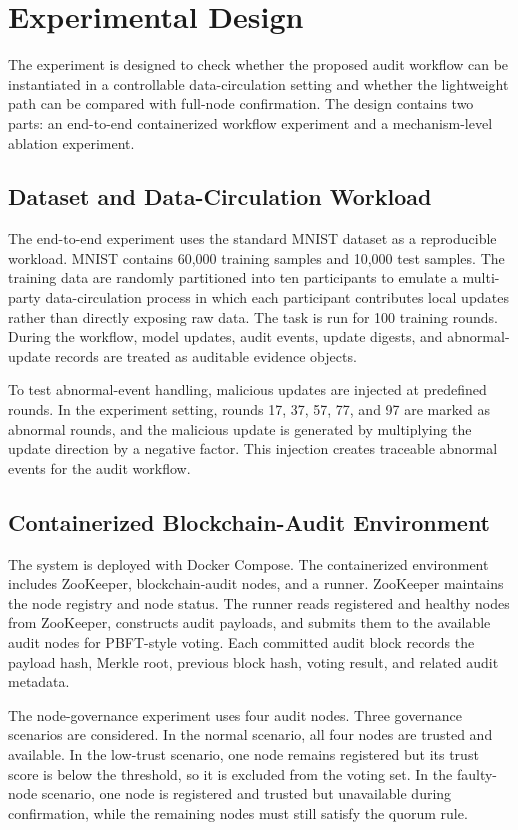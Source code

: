 \section{Experimental Design}

The experiment is designed to check whether the proposed audit workflow can be instantiated in a controllable data-circulation setting and whether the lightweight path can be compared with full-node confirmation. The design contains two parts: an end-to-end containerized workflow experiment and a mechanism-level ablation experiment.

\subsection{Dataset and Data-Circulation Workload}

The end-to-end experiment uses the standard MNIST dataset as a reproducible workload. MNIST contains 60,000 training samples and 10,000 test samples. The training data are randomly partitioned into ten participants to emulate a multi-party data-circulation process in which each participant contributes local updates rather than directly exposing raw data. The task is run for 100 training rounds. During the workflow, model updates, audit events, update digests, and abnormal-update records are treated as auditable evidence objects.

To test abnormal-event handling, malicious updates are injected at predefined rounds. In the experiment setting, rounds 17, 37, 57, 77, and 97 are marked as abnormal rounds, and the malicious update is generated by multiplying the update direction by a negative factor. This injection creates traceable abnormal events for the audit workflow.

\subsection{Containerized Blockchain-Audit Environment}

The system is deployed with Docker Compose. The containerized environment includes ZooKeeper, blockchain-audit nodes, and a runner. ZooKeeper maintains the node registry and node status. The runner reads registered and healthy nodes from ZooKeeper, constructs audit payloads, and submits them to the available audit nodes for PBFT-style voting. Each committed audit block records the payload hash, Merkle root, previous block hash, voting result, and related audit metadata.

The node-governance experiment uses four audit nodes. Three governance scenarios are considered. In the normal scenario, all four nodes are trusted and available. In the low-trust scenario, one node remains registered but its trust score is below the threshold, so it is excluded from the voting set. In the faulty-node scenario, one node is registered and trusted but unavailable during confirmation, while the remaining nodes must still satisfy the quorum rule.

